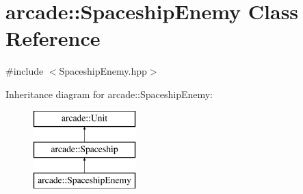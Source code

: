 \hypertarget{classarcade_1_1_spaceship_enemy}{}\section{arcade\+:\+:Spaceship\+Enemy Class Reference}
\label{classarcade_1_1_spaceship_enemy}


{\ttfamily \#include $<$Spaceship\+Enemy.\+hpp$>$}

Inheritance diagram for arcade\+:\+:Spaceship\+Enemy\+:\begin{figure}[H]
\begin{center}
\leavevmode
\includegraphics[height=3.000000cm]{classarcade_1_1_spaceship_enemy}
\end{center}
\end{figure}
